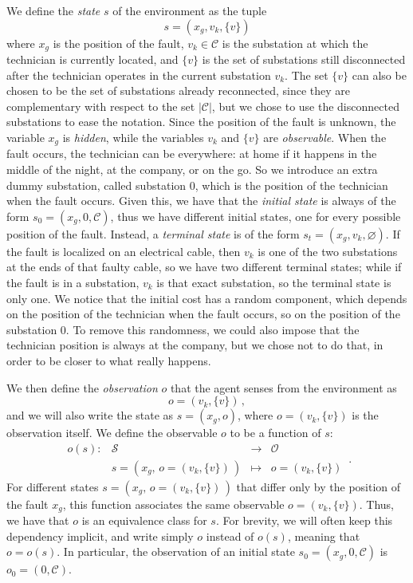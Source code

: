 We define the \emph{state} $s$ of the environment as the tuple
\begin{equation}
    s = (x_g, v_k, \{v\})
\end{equation}
where $x_g$ is the position of the fault, $v_k \in \mathcal C$ is the substation at which the technician is currently located, and $\{v\}$ is the set of substations still disconnected after the technician operates in the current substation $v_k$. The set $\{v\}$ can also be chosen to be the set of substations already reconnected, since they are complementary with respect to the set $|\mathcal C|$, but we chose to use the disconnected substations to ease the notation. Since the position of the fault is unknown, the variable $x_g$ is \emph{hidden}, while the variables $v_k$ and $\{v\}$ are \emph{observable}. When the fault occurs, the technician can be everywhere: at home if it happens in the middle of the night, at the company, or on the go. So we introduce an extra dummy substation, called substation $0$, which is the position of the technician when the fault occurs. Given this, we have that the \emph{initial state} is always of the form $s_0 = (x_g, 0, \mathcal C)$, thus we have different initial states, one for every possible position of the fault. Instead, a \emph{terminal state} is of the form $s_t = (x_g, v_k, \varnothing)$. If the fault is localized on an electrical cable, then $v_k$ is one of the two substations at the ends of that faulty cable, so we have two different terminal states; while if the fault is in a substation, $v_k$ is that exact substation, so the terminal state is only one. We notice that the initial cost has a random component, which depends on the position of the technician when the fault occurs, so on the position of the substation $0$. To remove this randomness, we could also impose that the technician position is always at the company, but we chose not to do that, in order to be closer to what really happens.

We then define the \emph{observation} $o$ that the agent senses from the environment as
\begin{equation}
    o = (v_k, \{v\}) \, ,
\end{equation}
and we will also write the state as $s=(x_g, o)$, where $o = (v_k, \{v\})$ is the observation itself. We define the observable $o$ to be a function of $s$:
\begin{equation}
    \begin{array}{cccc}
    o(s): & \mathcal S                                     & \rightarrow & \mathcal O       \\
          & s = (x_g, \, o = \left( v_k, \{v\} \right) \,) & \mapsto     & o = (v_k, \{v\})
\end{array} \, .
\end{equation}
For different states $s = (x_g, \, o = \left( v_k, \{v\} \right) \,)$ that differ only by the position of the fault $x_g$, this function associates the same observable $o = (v_k, \{v\})$. Thus, we have that $o$ is an equivalence class for $s$. For brevity, we will often keep this dependency implicit, and write simply $o$ instead of $o(s)$, meaning that $o = o(s)$. In particular, the observation of an initial state $s_0 = (x_g, 0, \mathcal C)$ is $o_0 = (0, \mathcal C)$.

